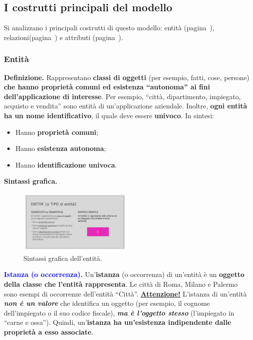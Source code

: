 \documentclass[a4paper]{article}
\newcommand{\dquotes}[1]{``#1''}
\begin{document}
	\newpage
	
	
	
	
	\subsection{I costrutti principali del modello}
	
	Si analizzano i principali costrutti di questo modello: entità (pagina~\pageref{par: entità}), relazioni(pagina~\pageref{par: relazioni}) e attributi (pagina~\pageref{par: attributi}).
	
	\subsubsection{Entità}\label{par: entità}
	\textcolor{Red3}{\textbf{Definizione.}} Rappresentano \textbf{classi di oggetti} (per esempio, fatti, cose, persone) \textbf{che hanno proprietà comuni ed esistenza \dquotes{autonoma} ai fini dell'applicazione di interesse}. Per esempio, \dquotes{città, dipartimento, impiegato, acquisto e vendita} sono entità di un'applicazione aziendale. Inoltre, \textbf{ogni entità ha un nome identificativo}, il quale deve essere \textbf{univoco}. In sintesi:
	
	\begin{itemize}
		\item Hanno \textbf{proprietà comuni};
		\item Hanno \textbf{esistenza autonoma};
		\item Hanno \textbf{identificazione univoca}.
	\end{itemize}

	\noindent
	\textcolor{Green4}{\textbf{Sintassi grafica.}}
	
	\begin{figure}[!htp]
		\centering
		\includegraphics[width=0.5\textwidth]{img/entita_def.pdf}
		\caption{Sintassi grafica dell'entità.}
	\end{figure}

	\noindent
	\textcolor{blue}{\textbf{Istanza (o occorrenza).}} Un'\textbf{istanza} (o occorrenza) di un'entità è un \textbf{oggetto della classe che l'entità rappresenta}. Le città di Roma, Milano e Palermo sono esempi di occorrenze dell'entità \dquotes{Città}.\newline
	\textbf{\underline{Attenzione!}} L'istanza di un'entità \textbf{\emph{non è un valore}} che identifica un oggetto (per esempio, il cognome dell'impiegato o il suo codice fiscale),\textbf{\emph{ ma è l'oggetto stesso}} (l'impiegato in \dquotes{carne e ossa}). Quindi, un'\textbf{istanza ha un'esistenza indipendente dalle proprietà a esso associate}.
	
\end{document}
